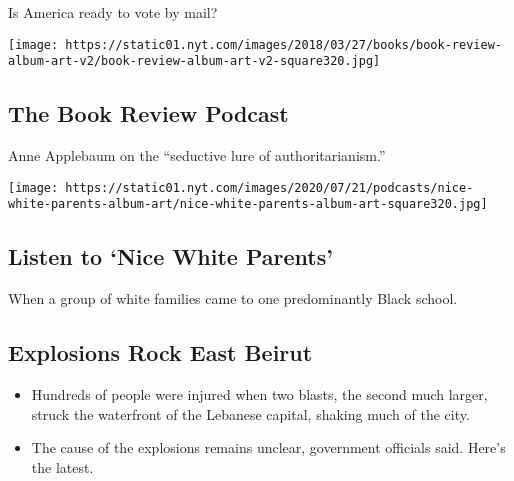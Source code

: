Is America ready to vote by mail?

\href{/2020/07/31/books/review/podcast-twilight-democracy-anne-applebaum-eat-buddha-barbara-demick.html}{}

\texttt{[image: https://static01.nyt.com/images/2018/03/27/books/book-review-album-art-v2/book-review-album-art-v2-square320.jpg]}

\href{/2020/07/31/books/review/podcast-twilight-democracy-anne-applebaum-eat-buddha-barbara-demick.html}{}

\hypertarget{the-book-review-podcast}{%
\subsection{The Book Review Podcast}\label{the-book-review-podcast}}

Anne Applebaum on the ``seductive lure of authoritarianism.''

\href{/2020/07/30/podcasts/nice-white-parents-serial.html}{}

\texttt{[image: https://static01.nyt.com/images/2020/07/21/podcasts/nice-white-parents-album-art/nice-white-parents-album-art-square320.jpg]}

\href{/2020/07/30/podcasts/nice-white-parents-serial.html}{}

\hypertarget{listen-to-nice-white-parents}{%
\subsection{Listen to `Nice White
Parents'}\label{listen-to-nice-white-parents}}

When a group of white families came to one predominantly Black school.

\href{/2020/08/04/world/middleeast/beirut-explosion-blast.html}{}

\hypertarget{explosions-rock-east-beirut}{%
\subsection{Explosions Rock East
Beirut}\label{explosions-rock-east-beirut}}

\begin{itemize}
\tightlist
\item
  Hundreds of people were injured when two blasts, the second much
  larger, struck the waterfront of the Lebanese capital, shaking much of
  the city.
\item
  The cause of the explosions remains unclear, government officials
  said. Here's the latest.
\end{itemize}

